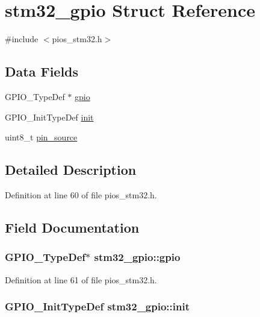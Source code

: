 \hypertarget{structstm32__gpio}{\section{stm32\-\_\-gpio \-Struct \-Reference}
\label{structstm32__gpio}
}


{\ttfamily \#include $<$pios\-\_\-stm32.\-h$>$}

\subsection*{\-Data \-Fields}
\begin{DoxyCompactItemize}
\item 
\-G\-P\-I\-O\-\_\-\-Type\-Def $\ast$ \hyperlink{structstm32__gpio_a3d54b128262b814ecf0ad412093b6402}{gpio}
\item 
\-G\-P\-I\-O\-\_\-\-Init\-Type\-Def \hyperlink{structstm32__gpio_ab4cf4debf63492af696cf1f340a42824}{init}
\item 
uint8\-\_\-t \hyperlink{structstm32__gpio_a79c5a3ec6b45fc1a2c4921c81f79ca42}{pin\-\_\-source}
\end{DoxyCompactItemize}


\subsection{\-Detailed \-Description}


\-Definition at line 60 of file pios\-\_\-stm32.\-h.



\subsection{\-Field \-Documentation}
\hypertarget{structstm32__gpio_a3d54b128262b814ecf0ad412093b6402}{
\subsubsection[{gpio}]{\setlength{\rightskip}{0pt plus 5cm}\-G\-P\-I\-O\-\_\-\-Type\-Def$\ast$ {\bf stm32\-\_\-gpio\-::gpio}}}\label{structstm32__gpio_a3d54b128262b814ecf0ad412093b6402}


\-Definition at line 61 of file pios\-\_\-stm32.\-h.

\hypertarget{structstm32__gpio_ab4cf4debf63492af696cf1f340a42824}{
\subsubsection[{init}]{\setlength{\rightskip}{0pt plus 5cm}\-G\-P\-I\-O\-\_\-\-Init\-Type\-Def {\bf stm32\-\_\-gpio\-::init}}}\label{structstm32__gpio_ab4cf4debf63492af696cf1f340a42824}


